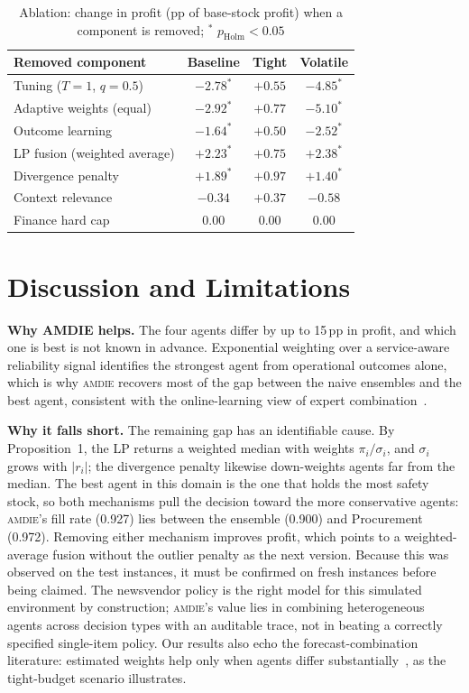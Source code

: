 \documentclass[conference]{IEEEtran}
\newcommand{\amdie}{\textsc{amdie}}
\begin{document}
\begin{table}[t]
\centering\footnotesize
\caption{Ablation: change in profit (pp of base-stock profit) when a component is removed; $^\ast$ $p_{\text{Holm}}<0.05$}
\label{tab:ablation}
\setlength{\tabcolsep}{4pt}
\begin{tabular}{@{}lccc@{}}
\toprule
Removed component & Baseline & Tight & Volatile \\
\midrule
Tuning ($T{=}1$, $q{=}0.5$)          & $-2.78^\ast$ & $+0.55$ & $-4.85^\ast$ \\
Adaptive weights (equal)             & $-2.92^\ast$ & $+0.77$ & $-5.10^\ast$ \\
Outcome learning                     & $-1.64^\ast$ & $+0.50$ & $-2.52^\ast$ \\
LP fusion (weighted average)         & $+2.23^\ast$ & $+0.75$ & $+2.38^\ast$ \\
Divergence penalty                   & $+1.89^\ast$ & $+0.97$ & $+1.40^\ast$ \\
Context relevance                    & $-0.34$      & $+0.37$ & $-0.58$ \\
Finance hard cap                     & $0.00$       & $0.00$  & $0.00$ \\
\bottomrule
\end{tabular}
\end{table}

\section{Discussion and Limitations}
\textbf{Why AMDIE helps.} The four agents differ by up to 15\,pp in profit, and which one is best is not known in advance. Exponential weighting over a service-aware reliability signal identifies the strongest agent from operational outcomes alone, which is why \amdie{} recovers most of the gap between the naive ensembles and the best agent, consistent with the online-learning view of expert combination~\cite{freund1997}.

\textbf{Why it falls short.} The remaining gap has an identifiable cause. By Proposition~1, the LP returns a weighted median with weights $\pi_i/\sigma_i$, and $\sigma_i$ grows with $|r_i|$; the divergence penalty likewise down-weights agents far from the median. The best agent in this domain is the one that holds the most safety stock, so both mechanisms pull the decision toward the more conservative agents: \amdie{}'s fill rate (0.927) lies between the ensemble (0.900) and Procurement (0.972). Removing either mechanism improves profit, which points to a weighted-average fusion without the outlier penalty as the next version. Because this was observed on the test instances, it must be confirmed on fresh instances before being claimed. The newsvendor policy is the right model for this simulated environment by construction; \amdie{}'s value lies in combining heterogeneous agents across decision types with an auditable trace, not in beating a correctly specified single-item policy. Our results also echo the forecast-combination literature: estimated weights help only when agents differ substantially~\cite{smith2009}, as the tight-budget scenario illustrates.
\end{document}
